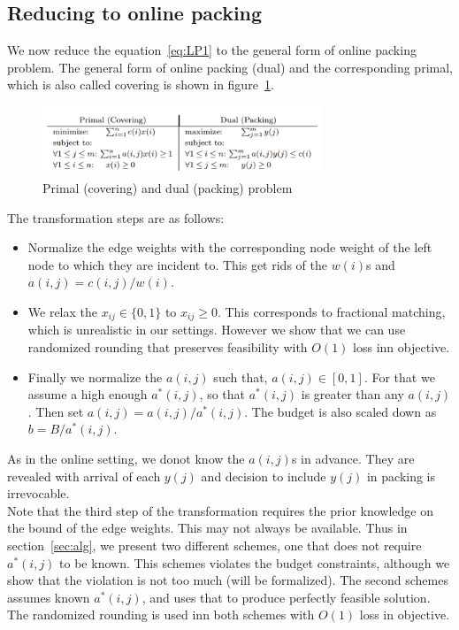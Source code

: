 \subsection{Reducing to online packing}
We now reduce the equation~\ref{eq:LP1} to the general form of online packing problem. The general form of online packing (dual) and the corresponding primal, which is also called covering is shown in figure~\ref{fig:pd}.\\
\begin{figure}[h]
  \centering
  \includegraphics[width=3.3in]{figs/primal-dual.png}
  \caption{Primal (covering) and dual (packing) problem}
  \label{fig:pd}
\end{figure}
The transformation steps are as follows:
\begin{itemize}
\item Normalize the edge weights with the corresponding node weight of the left node to which they are incident to. This get rids of the $w(i)$s and $a(i,j) = c(i,j) / w(i)$.
\item We relax the $x_{ij} \in \{0,1\}$ to $x_{ij} \geq 0$. This corresponds to fractional matching, which is unrealistic in our settings. However we show that we can use randomized rounding that preserves feasibility with $O(1)$ loss inn objective.
\item Finally we normalize the $a(i,j)$ such that, $a(i,j) \in [0,1]$. For that we assume a high enough $a^\ast(i,j)$, so that $a^\ast(i,j)$ is greater than any $a(i,j)$. Then set $a(i,j) = a(i,j) /a^\ast(i,j) $. The budget is also scaled down as $b = B /a^\ast(i,j) $.
\end{itemize}
As in the online setting, we donot know the $a(i,j)$s in advance. They are revealed with arrival of each $y(j)$ and decision to include $y(j)$ in packing is irrevocable.\\
Note that the third step of the transformation requires the prior knowledge on the bound of the edge weights. This may not always be available. Thus in section~\ref{sec:alg}, we present two different schemes, one that does not require $a^\ast(i,j)$ to be known. This schemes violates the budget constraints, although we show that the violation is not too much (will be formalized). The second schemes assumes known $a^\ast(i,j)$, and uses that to produce perfectly feasible solution. The randomized rounding is used inn both schemes with $O(1)$ loss in objective. 
